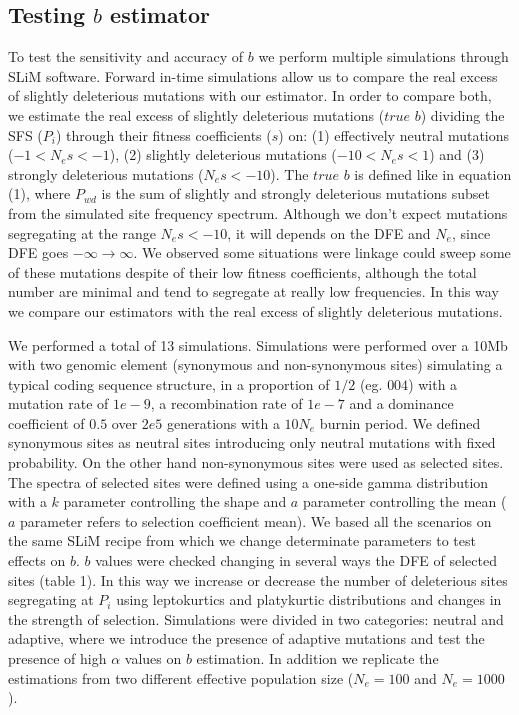 \documentclass[11pt]{article}
\begin{document}
\subsection{Testing $b$ estimator}
To test the sensitivity and accuracy of $b$ we perform multiple simulations through SLiM software. Forward in-time simulations allow us to compare the real excess of slightly deleterious mutations with our estimator. In order to compare both, we estimate the real excess of slightly deleterious mutations ($true$ $b$) dividing the SFS ($P_{i}$) through their fitness coefficients ($s$) on: (1) effectively neutral mutations ($-1 < N_{e}s < -1$), (2) slightly deleterious mutations ($-10 < N_{e}s < 1$) and (3) strongly deleterious mutations ($N_{e}s < -10$). The $true$ $b$ is defined like in equation (1), where $P_{wd}$ is the sum of slightly and strongly deleterious mutations subset from the simulated site frequency spectrum. Although we don't expect mutations segregating at the range $N_{e}s < -10$, it will depends on the DFE and $N_{e}$, since DFE goes $-\infty \to \infty$. We observed some situations were linkage could sweep some of these mutations despite of their low fitness coefficients, although the total number are minimal and tend to segregate at really low frequencies. In this way we compare our estimators with the real excess of slightly deleterious mutations.

We performed a total of 13 simulations. Simulations were performed over a 10Mb with two genomic element (synonymous and non-synonymous sites) simulating a typical coding sequence structure, in a proportion of ${1}/{2}$ (eg. $004$) with a mutation rate of $1e-9$, a recombination rate of $1e-7$ and a dominance coefficient of $0.5$ over $2e5$ generations with a $10N_{e}$ burnin period. We defined synonymous sites as neutral sites introducing only neutral mutations with fixed probability. On the other hand non-synonymous sites were used as selected sites. The spectra of selected sites were defined using a one-side gamma distribution with a $k$ parameter controlling the shape and $a$ parameter controlling the mean ($a$ parameter refers to selection coefficient mean). We based all the scenarios on the same SLiM recipe from which we change determinate parameters to test effects on $b$. $b$ values were checked changing in several ways the DFE of selected sites (table 1). In this way we increase or decrease the number of deleterious sites segregating at $P_{i}$ using leptokurtics and platykurtic distributions and changes in the strength of selection. Simulations were divided in two categories: neutral and adaptive, where we introduce the presence of adaptive mutations and test the presence of high $\alpha$ values on $b$ estimation. In addition we replicate the estimations from two different effective population size ($N_{e} = 100$ and $N_{e} = 1000$).
\end{document}

